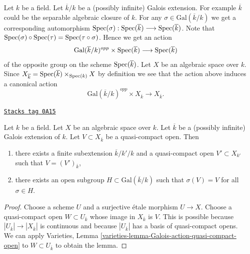 Let $k$ be a field. Let $\overline{k}/k$ be a (possibly infinite)
Galois extension. For example $\overline{k}$ could be the
separable algebraic closure of $k$.
For any $\sigma \in \text{Gal}(\overline{k}/k)$ we get a corresponding
automorphism
$
\operatorname{Spec}(\sigma) :
\operatorname{Spec}(\overline{k})
\longrightarrow
\operatorname{Spec}(\overline{k})
$.
Note that
$\operatorname{Spec}(\sigma) \circ \operatorname{Spec}(\tau) = \operatorname{Spec}(\tau \circ \sigma)$.
Hence we get an action
$$
\text{Gal}(\overline{k}/k)^{opp} \times \operatorname{Spec}(\overline{k})
\longrightarrow
\operatorname{Spec}(\overline{k})
$$
of the opposite group on the scheme $\operatorname{Spec}(\overline{k})$.
Let $X$ be an algebraic space over $k$. Since
$X_{\overline{k}} =
\operatorname{Spec}(\overline{k}) \times_{\operatorname{Spec}(k)} X$
by definition we see that the action above induces a canonical action
\begin{equation}
\label{equation-galois-action-base-change-kbar}
\text{Gal}(\overline{k}/k)^{opp} \times X_{\overline{k}}
\longrightarrow
X_{\overline{k}}.
\end{equation}

\begin{lemma}
\label{spaces-over-fields-lemma-Galois-action-quasi-compact-open}
\href{https://stacks.math.columbia.edu/tag/0A15}{\texttt{Stacks tag 0A15}}

Let $k$ be a field. Let $X$ be an algebraic space over $k$.
Let $\overline{k}$ be a (possibly infinite) Galois extension of $k$.
Let $V \subset X_{\overline{k}}$ be a quasi-compact open.
Then
\begin{enumerate}
\item there exists a finite subextension $\overline{k}/k'/k$
and a quasi-compact open $V' \subset X_{k'}$ such that
$V = (V')_{\overline{k}}$,
\item there exists an open subgroup $H \subset \text{Gal}(\overline{k}/k)$
such that $\sigma(V) = V$ for all $\sigma \in H$.
\end{enumerate}
\end{lemma}

\begin{proof}
Choose a scheme $U$ and a surjective \'etale morphism $U \to X$.
Choose a quasi-compact open $W \subset U_{\overline{k}}$ whose
image in $X_{\overline{k}}$ is $V$. This is possible because
$|U_{\overline{k}}| \to |X_{\overline{k}}|$ is continuous and because
$|U_{\overline{k}}|$ has a basis of quasi-compact opens. We can apply
Varieties, Lemma
\ref{varieties-lemma-Galois-action-quasi-compact-open}
to $W \subset U_{\overline{k}}$ to obtain the lemma.
\end{proof}

